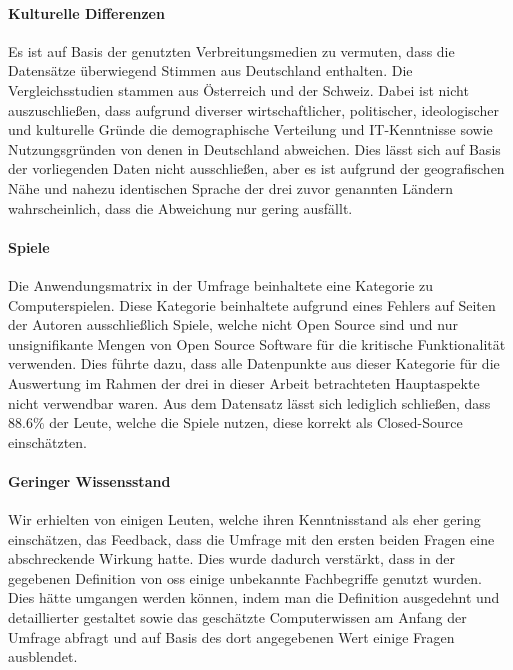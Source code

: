 \documentclass[a4paper]{article}
\begin{document}
            \paragraph{Kulturelle Differenzen}
                Es ist auf Basis der genutzten Verbreitungsmedien zu vermuten, dass die Datensätze überwiegend Stimmen aus Deutschland enthalten. Die Vergleichsstudien stammen aus Österreich\cite{demographicDistributionKnowledge} und der Schweiz\cite{oss:studie}. Dabei ist nicht auszuschließen, dass aufgrund diverser wirtschaftlicher, politischer, ideologischer und kulturelle Gründe die demographische Verteilung und IT-Kenntnisse sowie Nutzungsgründen von denen in Deutschland abweichen. Dies lässt sich auf Basis der vorliegenden Daten nicht ausschließen, aber es ist aufgrund der geografischen Nähe und nahezu identischen Sprache der drei zuvor genannten Ländern wahrscheinlich, dass die Abweichung nur gering ausfällt.
                
            \paragraph{Spiele}
                Die Anwendungsmatrix in der Umfrage beinhaltete eine Kategorie zu Computerspielen. Diese Kategorie beinhaltete aufgrund eines Fehlers auf Seiten der Autoren ausschließlich Spiele, welche nicht Open Source sind und nur unsignifikante Mengen von Open Source Software für die kritische Funktionalität verwenden. Dies führte dazu, dass alle Datenpunkte aus dieser Kategorie für die Auswertung im Rahmen der drei in dieser Arbeit betrachteten Hauptaspekte nicht verwendbar waren. Aus dem Datensatz lässt sich lediglich schließen, dass $88.6\%$ der Leute, welche die Spiele nutzen, diese korrekt als Closed-Source einschätzten.
                
            \paragraph{Geringer Wissensstand}
                Wir erhielten von einigen Leuten, welche ihren Kenntnisstand als eher gering einschätzen, das Feedback, dass die Umfrage mit den ersten beiden Fragen eine abschreckende Wirkung hatte. Dies wurde dadurch verstärkt, dass in der gegebenen Definition von \gls{oss} einige unbekannte Fachbegriffe genutzt wurden. Dies hätte umgangen werden können, indem man die Definition ausgedehnt und detaillierter gestaltet sowie das geschätzte Computerwissen am Anfang der Umfrage abfragt und auf Basis des dort angegebenen Wert einige Fragen ausblendet.
            
\end{document}
